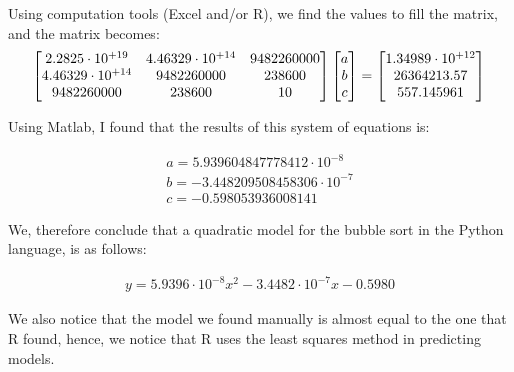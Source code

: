 \documentclass[]{report}
\begin{document}
				Using computation tools (Excel and/or R), we find the values to fill the matrix, and the matrix becomes:
				\\
				\begin{equation}
						\begin{bmatrix}
						2.2825 \cdot 10^{+19} & 4.46329\cdot 10^{+14} & 9482260000 \\
						4.46329\cdot 10^{+14} & 9482260000 & 238600 \\
						9482260000 & 238600 & 10 \\
						\end{bmatrix}
						\begin{bmatrix}
						a \\
						b \\
						c \\
						\end{bmatrix}
						=
						\begin{bmatrix}
						1.34989\cdot 10^{+12} \\
						26364213.57 \\
						557.145961 \\
						\end{bmatrix} \\
				\end{equation}				
		 		
		 		Using Matlab, I found that the results of this system of equations is:
		 		
		 		\begin{equation}
		 			\begin{align}
						a = 5.939604847778412\cdot10^{-8}\\
						b = -3.448209508458306\cdot10^{-7}\\
						c = -0.598053936008141
		 			\end{align}
				\end{equation}
				
				We, therefore conclude that a quadratic model for the bubble sort in the Python language, is as follows:
				
				\begin{ceqn}
					\begin{align}
		 				y = 5.9396\cdot10^{-8}x^2 -3.4482\cdot10^{-7}x -0.5980
					\end{align}
				\end{ceqn}
				
				We also notice that the model we found manually is almost equal to the one that R found, hence, we notice that R uses the least squares method in predicting models.
				
\end{document}
